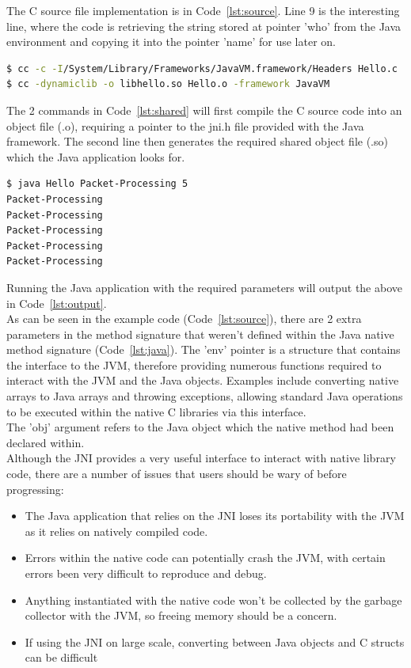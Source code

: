 \documentclass[interim_report.tex]{subfiles}
\begin{document}
The C source file implementation is in Code~\ref{lst:source}. Line 9 is the interesting line, where the code is retrieving the string stored at pointer 'who' from the Java environment and copying it into the pointer 'name' for use later on.

\begin{lstlisting}[language=sh, caption={Terminal commands to generate shared library file (.so)}, label=lst:shared]
$ cc -c -I/System/Library/Frameworks/JavaVM.framework/Headers Hello.c
$ cc -dynamiclib -o libhello.so Hello.o -framework JavaVM
\end{lstlisting}

The 2 commands in Code~\ref{lst:shared} will first compile the C source code into an object file (.o), requiring a pointer to the jni.h file provided with the Java framework. The second line then generates the required shared object file (.so) which the Java application looks for.

\begin{lstlisting}[language=sh, caption={Output from running Java application calling native C methods}, label=lst:output]
$ java Hello Packet-Processing 5
Packet-Processing
Packet-Processing
Packet-Processing
Packet-Processing
Packet-Processing
\end{lstlisting}

Running the Java application with the required parameters will output the above in Code~\ref{lst:output}. \\
\newline
As can be seen in the example code (Code~\ref{lst:source}), there are 2 extra parameters in the method signature that weren't defined within the Java native method signature (Code~\ref{lst:java}). The 'env' pointer is a structure that contains the interface to the JVM, therefore providing numerous functions required to interact with the JVM and the Java objects. Examples include converting native arrays to Java arrays and throwing exceptions, allowing standard Java operations to be executed within the native C libraries via this interface. \\
\newline
The 'obj' argument refers to the Java object which the native method had been declared within. \\
\newline
Although the JNI provides a very useful interface to interact with native library code, there are a number of issues that users should be wary of before progressing:
\begin{itemize}
	\item The Java application that relies on the JNI loses its portability with the JVM as it relies on natively compiled code.
	\item Errors within the native code can potentially crash the JVM, with certain errors been very difficult to reproduce and debug.
	\item Anything instantiated with the native code won't be collected by the garbage collector with the JVM, so freeing memory should be a concern.
	\item If using the JNI on large scale, converting between Java objects and C structs can be difficult
\end{itemize}
\end{document}
